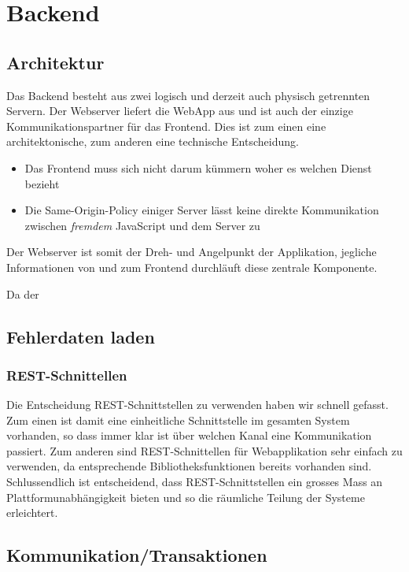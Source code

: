 \chapter{Backend}
\label{backend}

\section{Architektur}
Das Backend besteht aus zwei logisch und derzeit auch physisch getrennten Servern. 
Der Webserver liefert die \gls{WebApp} aus und ist auch der einzige Kommunikationspartner für das Frontend. Dies ist zum einen eine architektonische, zum anderen eine technische Entscheidung.

\begin{itemize}
\item Das Frontend muss sich nicht darum kümmern woher es welchen Dienst bezieht
\item Die Same-Origin-Policy\cite{sop} einiger Server lässt keine direkte Kommunikation zwischen \emph{fremdem} JavaScript und dem Server zu
\end{itemize}

Der Webserver ist somit der Dreh- und Angelpunkt der Applikation, jegliche Informationen von und zum Frontend durchläuft diese zentrale Komponente.

Da der 

\section{Fehlerdaten laden}

\subsection{REST-Schnittellen}
Die Entscheidung \gls{REST}-Schnittstellen zu verwenden haben wir schnell gefasst. 
Zum einen ist damit eine einheitliche Schnittstelle im gesamten System vorhanden, so dass immer klar ist über welchen Kanal eine Kommunikation passiert.
Zum anderen sind \gls{REST}-Schnittellen für Webapplikation sehr einfach zu verwenden, da entsprechende Bibliotheksfunktionen bereits vorhanden sind.
Schlussendlich ist entscheidend, dass \gls{REST}-Schnittstellen ein grosses Mass an Plattformunabhängigkeit bieten und so die räumliche Teilung der Systeme erleichtert.


\section{Kommunikation/Transaktionen}

